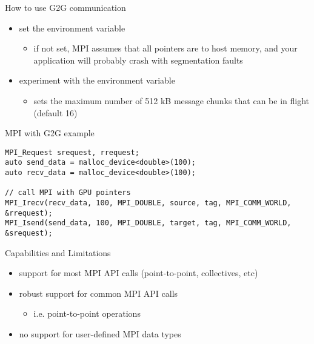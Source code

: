 \begin{frame}[fragile]{}
    \begin{info}{How to use G2G communication}
        \begin{itemize}
            \item set the environment variable 
            \begin{itemize}
                \item if not set, MPI assumes that all pointers are to host memory, and your application will probably crash with segmentation faults
            \end{itemize}
            \item experiment with the environment variable 
            \begin{itemize}
                \item sets the maximum number of 512 kB message chunks that can be in flight (default 16)
            \end{itemize}
        \end{itemize}
    \end{info}
   \begin{code}{MPI with G2G example}
        \begin{lstlisting}[style=boxcudatiny]
MPI_Request srequest, rrequest;
auto send_data = malloc_device<double>(100);
auto recv_data = malloc_device<double>(100);

// call MPI with GPU pointers
MPI_Irecv(recv_data, 100, MPI_DOUBLE, source, tag, MPI_COMM_WORLD, &rrequest);
MPI_Isend(send_data, 100, MPI_DOUBLE, target, tag, MPI_COMM_WORLD, &srequest);
        \end{lstlisting}
   \end{code}

\end{frame}

\begin{frame}[fragile]{}
    \begin{info}{Capabilities and Limitations}
        \begin{itemize}
            \item support for most MPI API calls (point-to-point, collectives, etc)
            \item robust support for common MPI API calls
            \begin{itemize}
                \item i.e. point-to-point operations 
            \end{itemize}
            \item no support for user-defined MPI data types
        \end{itemize}
    \end{info}
\end{frame}

